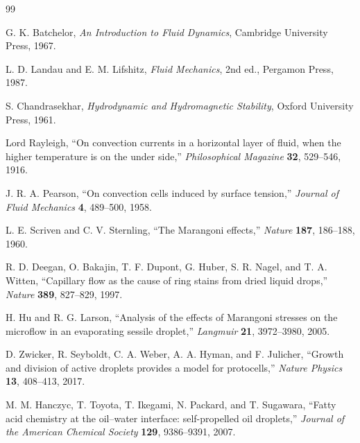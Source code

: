 \documentclass[11pt]{article}
\begin{document}
\begin{thebibliography}{99}

G. K. Batchelor,
\emph{An Introduction to Fluid Dynamics},
Cambridge University Press, 1967.

L. D. Landau and E. M. Lifshitz,
\emph{Fluid Mechanics}, 2nd ed.,
Pergamon Press, 1987.

S. Chandrasekhar,
\emph{Hydrodynamic and Hydromagnetic Stability},
Oxford University Press, 1961.

Lord Rayleigh,
``On convection currents in a horizontal layer of fluid, when the higher
temperature is on the under side,''
\emph{Philosophical Magazine} \textbf{32}, 529--546, 1916.

J. R. A. Pearson,
``On convection cells induced by surface tension,''
\emph{Journal of Fluid Mechanics} \textbf{4}, 489--500, 1958.

L. E. Scriven and C. V. Sternling,
``The Marangoni effects,''
\emph{Nature} \textbf{187}, 186--188, 1960.

R. D. Deegan, O. Bakajin, T. F. Dupont, G. Huber, S. R. Nagel,
and T. A. Witten,
``Capillary flow as the cause of ring stains from dried liquid drops,''
\emph{Nature} \textbf{389}, 827--829, 1997.

H. Hu and R. G. Larson,
``Analysis of the effects of Marangoni stresses on the microflow in an
evaporating sessile droplet,''
\emph{Langmuir} \textbf{21}, 3972--3980, 2005.

D. Zwicker, R. Seyboldt, C. A. Weber, A. A. Hyman, and F. Julicher,
``Growth and division of active droplets provides a model for protocells,''
\emph{Nature Physics} \textbf{13}, 408--413, 2017.

M. M. Hanczyc, T. Toyota, T. Ikegami, N. Packard, and T. Sugawara,
``Fatty acid chemistry at the oil--water interface: self-propelled oil
droplets,''
\emph{Journal of the American Chemical Society} \textbf{129},
9386--9391, 2007.

\end{thebibliography}
\end{document}
